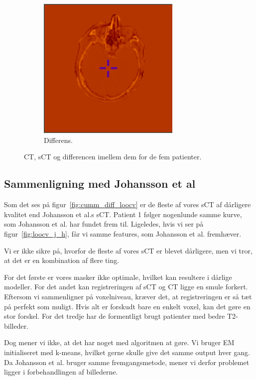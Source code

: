 \begin{figure}[H]
\begin{subfigure}[b]{0.3\textwidth}
        \includegraphics[width=0.75\textwidth]{colager/loocv_ct/loocv_011030_sub.png}
        \caption{Differens.}
        \label{col:loocv_ct_pat5_sub}
    \end{subfigure}
    \caption{CT, sCT og differencen imellem dem for de fem patienter.}
    \label{col:loocv_ct}
\end{figure}

\subsection{Sammenligning med Johansson et al}


Som det ses på figur~\ref{fig:cumm_diff_loocv} er de fleste af vores sCT af dårligere kvalitet end Johansson et al.s sCT. Patient 1 følger nogenlunde samme kurve, som Johansson et al. har fundet frem til. Ligeledes, hvis vi ser på figur~\ref{fig:loocv_j_h}, får vi samme features, som Johansson et al. fremhæver.

Vi er ikke sikre på, hvorfor de fleste af vores sCT er blevet dårligere, men vi tror, at det er en kombination af flere ting. 

For det første er vores masker ikke optimale, hvilket kan resultere i dårlige modeller. For det andet kan registreringen af sCT og CT ligge en smule forkert. Eftersom vi sammenligner på voxelniveau, kræver det, at registreringen er så tæt på perfekt som muligt. Hvis alt er forskudt bare en enkelt voxel, kan det gøre en stor forskel. For det tredje har de formentligt brugt patienter med bedre T2-billeder.

Dog mener vi ikke, at det har noget med algoritmen at gøre. Vi bruger EM initialiseret med k-means, hvilket gerne skulle give det samme output hver gang. Da Johansson et al. bruger samme fremgangsmetode, mener vi derfor problemet ligger i forbehandlingen af billederne.

